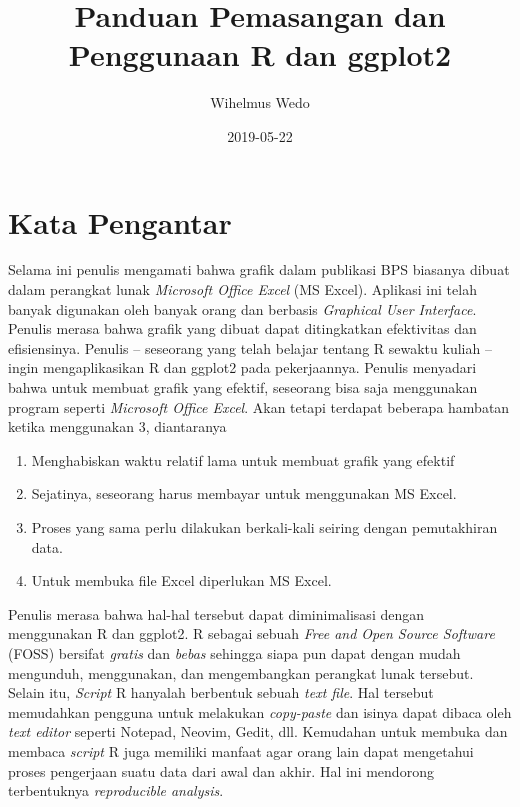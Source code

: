 \documentclass[]{book}
\title{Panduan Pemasangan dan Penggunaan R dan ggplot2}
\author{Wihelmus Wedo}
\date{2019-05-22}
\providecommand{\tightlist}{%
  \setlength{\itemsep}{0pt}\setlength{\parskip}{0pt}}
\begin{document}
\maketitle

{
\setcounter{tocdepth}{1}
\tableofcontents
}
\chapter*{Kata Pengantar}\label{kata-pengantar}

Selama ini penulis mengamati bahwa grafik dalam publikasi BPS biasanya
dibuat dalam perangkat lunak \emph{Microsoft Office Excel} (MS Excel).
Aplikasi ini telah banyak digunakan oleh banyak orang dan berbasis
\emph{Graphical User Interface}. Penulis merasa bahwa grafik yang dibuat
dapat ditingkatkan efektivitas dan efisiensinya. Penulis -- seseorang
yang telah belajar tentang R sewaktu kuliah -- ingin mengaplikasikan R
dan ggplot2 pada pekerjaannya. Penulis menyadari bahwa untuk membuat
grafik yang efektif, seseorang bisa saja menggunakan program seperti
\emph{Microsoft Office Excel}. Akan tetapi terdapat beberapa hambatan
ketika menggunakan 3, diantaranya

\begin{enumerate}
\def\labelenumi{\arabic{enumi}.}
\tightlist
\item
  Menghabiskan waktu relatif lama untuk membuat grafik yang efektif
\item
  Sejatinya, seseorang harus membayar untuk menggunakan MS Excel.
\item
  Proses yang sama perlu dilakukan berkali-kali seiring dengan
  pemutakhiran data.
\item
  Untuk membuka file Excel diperlukan MS Excel.
\end{enumerate}

Penulis merasa bahwa hal-hal tersebut dapat diminimalisasi dengan
menggunakan R dan ggplot2. R sebagai sebuah \emph{Free and Open Source
Software} (FOSS) bersifat \emph{gratis} dan \emph{bebas} sehingga siapa
pun dapat dengan mudah mengunduh, menggunakan, dan mengembangkan
perangkat lunak tersebut. Selain itu, \emph{Script} R hanyalah berbentuk
sebuah \emph{text file}. Hal tersebut memudahkan pengguna untuk
melakukan \emph{copy-paste} dan isinya dapat dibaca oleh \emph{text
editor} seperti Notepad, Neovim, Gedit, dll. Kemudahan untuk membuka dan
membaca \emph{script} R juga memiliki manfaat agar orang lain dapat
mengetahui proses pengerjaan suatu data dari awal dan akhir. Hal ini
mendorong terbentuknya \emph{reproducible analysis}.
\end{document}
